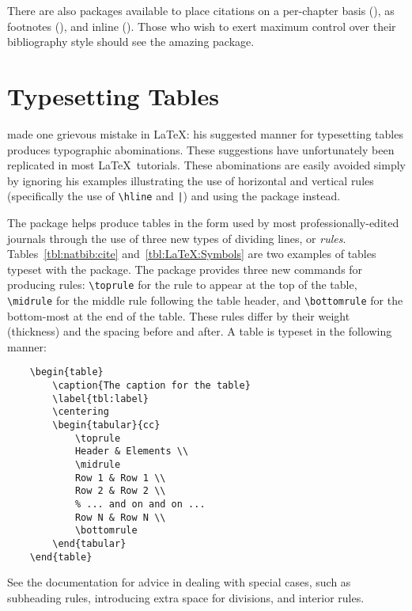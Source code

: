 There are also packages available to place citations on a per-chapter
basis (), as footnotes (),
and inline ().
Those who wish to exert maximum control over their bibliography
style should see the amazing  package.

\section{Typesetting Tables}
\label{sec:TypesettingTables}

\citet{lamport-1994-ladps} made one grievous mistake
in \LaTeX: his suggested manner for typesetting tables produces
typographic abominations.  These suggestions have unfortunately
been replicated in most \LaTeX\ tutorials.  These
abominations are easily avoided simply by ignoring his examples
illustrating the use of horizontal and vertical rules (specifically
the use of \verb+\hline+ and \verb+|+) and using the
 package instead.

The  package helps produce tables in the form
used by most professionally-edited journals through the use of
three new types of dividing lines, or \emph{rules}.
Tables~\ref{tbl:natbib:cite} and~\ref{tbl:LaTeX:Symbols} are two
examples of tables typeset with the  package.
The  package provides three new commands
for producing rules:
\verb+\toprule+ for the rule to appear at the top of the table,
\verb+\midrule+ for the middle rule following the table header,
and \verb+\bottomrule+ for the bottom-most at the end of the table.
These rules differ by their weight (thickness) and the spacing before
and after.
A table is typeset in the following manner:
\begin{lstlisting}
	\begin{table}
		\caption{The caption for the table}
		\label{tbl:label}
		\centering
		\begin{tabular}{cc}
			\toprule
			Header & Elements \\
			\midrule
			Row 1 & Row 1 \\
			Row 2 & Row 2 \\
			% ... and on and on ...
			Row N & Row N \\
			\bottomrule
		\end{tabular}
	\end{table}
\end{lstlisting}
See the  documentation for advice in dealing with
special cases, such as subheading rules, introducing extra space
for divisions, and interior rules.

